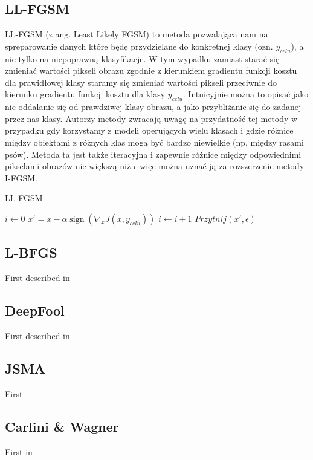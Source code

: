 \documentclass{article}
\begin{document}
    \subsection{LL-FGSM}
    LL-FGSM (z ang. Least Likely FGSM) to metoda pozwalająca nam na spreparowanie danych które będę przydzielane do
    konkretnej klasy (ozn. $y_{celu}$), a nie tylko na niepoprawną klasyfikacje. W tym wypadku zamiast starać się
    zmieniać wartości pikseli obrazu zgodnie z kierunkiem gradientu funkcji kosztu dla prawidłowej klasy
    staramy się zmieniać wartości pikseli przeciwnie do kierunku gradientu funkcji kosztu dla klasy $y_{celu}$.
    Intuicyjnie można to opisać jako nie oddalanie się od prawdziwej klasy obrazu, a jako przybliżanie się do zadanej
    przez nas klasy.
    Autorzy metody zwracają uwagę na przydatność tej metody
    w przypadku gdy korzystamy z modeli operujących wielu klasach i gdzie różnice między obiektami z różnych klas mogą
    być bardzo niewielkie (np. między rasami psów). Metoda ta jest także iteracyjna i zapewnie różnice między
    odpowiednimi pikselami obrazów nie większą niż $\epsilon$ więc można uznać ją za rozszerzenie metody I-FGSM.

    \begin{algorithm}
    \caption{LL-FGSM}\label{LLFGSM}
    \begin{algorithmic}[1]
    \State $i \gets 0$
        \State $x' = x - \alpha\operatorname{sign}(\nabla_{x} J(x, y_{celu}))$
        \State $i \gets i+1$
        \State $Przytnij(x', \epsilon)$
    \EndWhile
    \end{algorithmic}
    \end{algorithm}


\subsection{L-BFGS}
First described in \cite{DBLP:journals/corr/SzegedyZSBEGF13}

\subsection{DeepFool}
First described in \cite{DBLP:journals/corr/Moosavi-Dezfooli15}

\subsection{JSMA}
First \cite{DBLP:journals/corr/PapernotMJFCS15}

\subsection{Carlini & Wagner}
First in \cite{DBLP:journals/corr/CarliniW16a}
\end{document}
